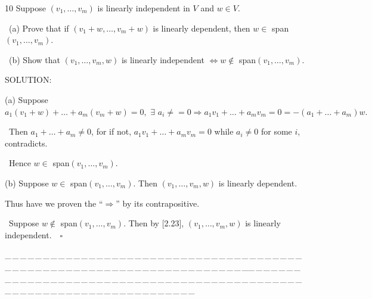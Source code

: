 \documentclass[a4paper, 11pt, UTF8]{article}
\begin{document}
\begin{large}
{\timesbf\Large 10} {\timessl\Large 
Suppose $(v_1,\dots,v_m)$ is linearly independent in $V$ and $w\in V$.}\par\quad\,
(a) {\timessl\Large Prove that if $(v_1+w,\dots,v_m+w)$ is linearly dependent, then $w\in$ span$(v_1,\dots,v_m)$.
}\par\quad\,
(b) {\timessl\Large Show that $(v_1,\dots,v_m,w)$ is linearly independent $\Longleftrightarrow w\not\in$ span$(v_1,\dots,v_m)$.
}\par
{\timesbf S\footnotesize{OLUTION:}}\par\quad
(a) Suppose $a_1(v_1+w)+\dots+a_m(v_m+w)=0,\,\,\exists\,\,a_i\neq=0\Rightarrow a_1 v_1+\dots+a_m v_m=0=-(a_1+\dots+a_m)w.$\par\qquad\,
Then $a_1+\dots+a_m\neq 0$, for if not, $a_1 v_1+\dots+a_m v_m=0$ while $a_i\neq 0$ for some $i$, contradicts.\par\qquad\,
Hence $w\in$ span$(v_1,\dots,v_m)$.\par\quad
(b) Suppose $w\in$ span$(v_1,\dots,v_m)$. Then $(v_1,\dots,v_m,w)$ is linearly dependent.\par\qquad\qquad Thus have we proven the “$\Rightarrow$” by its contrapositive.\par\qquad\,
Suppose $w\not\in$ span$(v_1,\dots,v_m)$. Then by [2.23], $(v_1,\dots,v_m,w)$ is linearly independent. $\,\,\,\,\square$\par
{\tiny \_\,\_\,\_\,\_\,\_\,\_\,\_\,\_\,\_\,\_\,\_\,\_\,\_\,\_\,\_\,\_\,\_\,\_\,\_\,\_\,\_\,\_\,\_\,\_\,\_\,\_\,\_\,\_\,\_\,\_\,\_\,\_\,\_\,\_\,\_\,\_\,\_\,\_\,\_\,\_\,\_\,\_\,\_\,\_\,\_\,\_\,\_\,\_\,\_\,\_\,\_\,\_\,\_\,\_\,\_\,\_\,\_\,\_\,\_\,\_\,\_\,\_\,\_\,\_\,\_\,\_\,\_\,\_\,\_\,\_\,\_\_\,\_\,\_\,\_\,\_\,\_\,\_\,\_\,\_\,\_\,\_\,\_\,\_\,\_\,\_\,\_\,\_\,\_\,\_\,\_\,\_\,\_\,\_\,\_\,\_\,\_\,\_\,\_\,\_\,\_\,\_\,\_\,\_\,\_\,\_\,\_\,\_\,\_\,\_\,\_\,\_\,\_\,\_\,\_\,\_\,\_\,\_\,\_\,\_\,\_\,\_\,\_\,\_\,\_\,\_\,\_\,\_\,\_\,\_\,\_\,\_\,\_\,\_\,\_\,\_\,\_\,\_\,\_\,\_\,\_\,\_}\par


\end{large}
\end{document}
